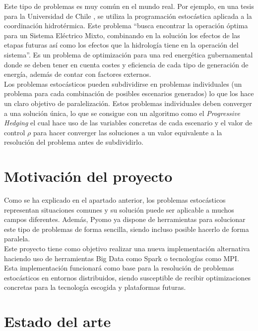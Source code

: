 Este tipo de problemas es muy común en el mundo real. Por ejemplo, en una tesis para la Universidad de Chile \cite{thesisHydro}, se utiliza la programación estocástica aplicada a la coordinación hidrotérmica. Este problema ``busca encontrar la operación óptima para un Sistema Eléctrico Mixto, combinando en la solución los efectos de las etapas futuras así como los efectos que la hidrología tiene en la operación del sistema''. Es un problema de optimización para una red energética gubernamental donde se deben tener en cuenta costes y eficiencia de cada tipo de generación de energía, además de contar con factores externos. \\

Los problemas estocásticos pueden subdividirse en problemas individuales (un problema para cada combinación de posibles escenarios generados) lo que los hace un claro objetivo de paralelización. Estos problemas individuales deben converger a una solución única, lo que se consigue con un algoritmo como el \textit{Progressive Hedging} el cual hace uso de las variables concretas de cada escenario y el valor de control $\rho$ para hacer converger las soluciones a un valor equivalente a la resolución del problema antes de subdividirlo.

\section{Motivación del proyecto}


Como se ha explicado en el apartado anterior, los problemas estocásticos representan situaciones comunes y su solución puede ser aplicable a muchos campos diferentes. Además, Pyomo ya dispone de herramientas para solucionar este tipo de problemas de forma sencilla, siendo incluso posible hacerlo de forma paralela.\\

Este proyecto tiene como objetivo realizar una nueva implementación alternativa haciendo uso de herramientas Big Data como Spark o tecnologías como MPI. Esta implementación funcionará como base para la resolución de problemas estocásticos en entornos distribuidos, siendo susceptible de recibir optimizaciones concretas para la tecnología escogida y plataformas futuras.

\section{Estado del arte}

